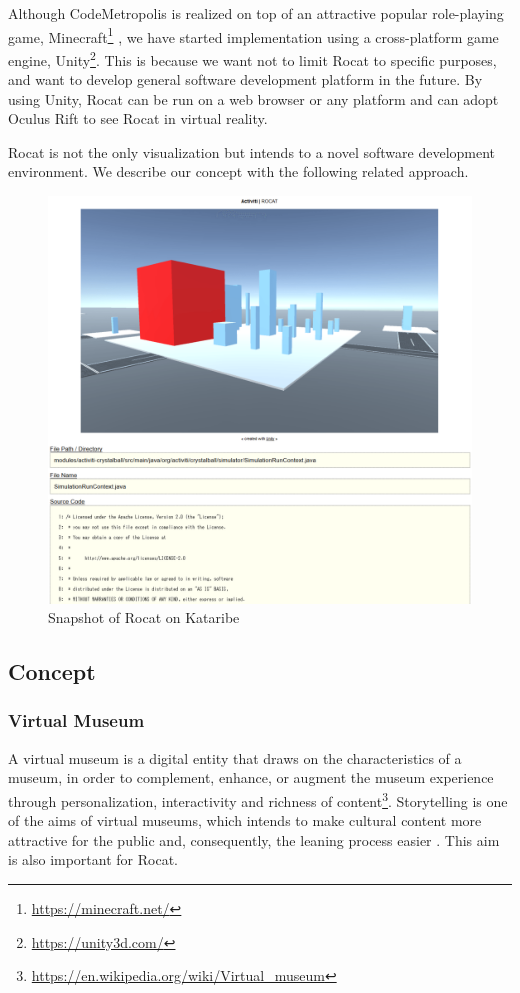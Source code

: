 \documentclass[conference]{IEEEtran}
\begin{document}
Although \textsf{CodeMetropolis} is realized on top of an attractive popular role-playing game, \textsf{Minecraft}\footnote{\url{https://minecraft.net/}} \cite{6648194}, we have started implementation using a cross-platform game engine, \textsf{Unity}\footnote{\url{https://unity3d.com/}}.
This is because we want not to limit \textsf{Rocat} to specific purposes, and want to develop general software development platform in the future.
By using \textsf{Unity}, \textsf{Rocat} can be run on a web browser or any platform and can adopt \textsf{Oculus Rift} to see \textsf{Rocat} in virtual reality.

\textsf{Rocat} is not the only visualization but intends to a novel software development environment.
We describe our concept with the following related approach.

\begin{figure}[tb]
\centering
\includegraphics[width=\linewidth]{Rocat-on-kataribe2.pdf}
\caption{Snapshot of \textsf{Rocat} on \textsf{Kataribe}}
\label{figure:Rocat-on-kataribe}
\end{figure}


\subsection{Concept}
\subsubsection{Virtual Museum}
A virtual museum is a digital entity that draws on the characteristics of a museum, in order to complement, enhance, or augment the museum
experience through personalization, interactivity and richness of content\footnote{\url{https://en.wikipedia.org/wiki/Virtual_museum}}.
Storytelling is one of the aims of virtual museums, which intends to make cultural content more attractive for the public and, consequently, the leaning process easier \cite{Pietroni:2014:IVR:2635823.2611375}.
This aim is also important for \textsf{Rocat}.
\end{document}
